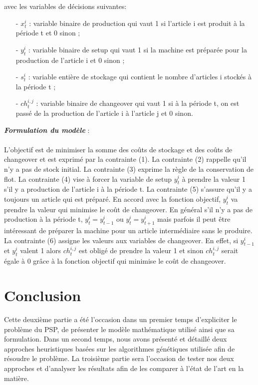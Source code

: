 \documentclass[12pt,a4paper]{article}
\begin{document}
		avec les variables de décisions suivantes: \\
		\begin{itemize}
			\item[-] $x_{t}^{i}$ : variable binaire de production qui vaut 1 si l’article i est produit à la période t et 0 sinon ;
			\item[-] $y_{t}^{i}$ : variable binaire de setup qui vaut 1 si la machine est préparée pour la production de l’article i et 0 sinon ;
			\item[-] $s_{t}^{i}$ : variable entière de stockage qui contient le nombre d’articles i stockés à la période t ; 
			\item[-] $ch_{t}^{i,j}$ : variable binaire de changeover qui vaut 1 si à la période t, on est passé de la production de l’article i à l’article j et 0 sinon.
		\end{itemize}
		\vspace*{.3cm}
		\textbf{\textsl{Formulation du modèle}} :\\
		\\
	\hspace*{.5cm} L'objectif est de minimiser la somme des coûts de stockage et des coûts de changeover et est exprimé par la contrainte (1). La contrainte (2) rappelle qu'il n'y a pas de stock initial. La contrainte (3) exprime la règle de la conservation de flot. La contrainte (4) vise à forcer la variable de setup $y_{t}^{i}$ à prendre la valeur 1 s’il y a production de l’article i à la période t. La contrainte (5) s'assure qu'il y a toujours un article qui est préparé. En accord avec la fonction objectif, $y_{t}^{i}$ va prendre la valeur qui minimise le coût de changeover. En général s’il n’y a pas de production à la période t,
$y_{t}^{i} = y_{t-1}^{i}$ ou $y_{t}^{i} = y_{t+1}^{i}$
mais parfois il peut être intéressant de préparer
la machine pour un article intermédiaire sans le produire. La contrainte (6) assigne les valeurs aux variables de changeover.
En effet, si $y_{t-1}^{i}$ et $y_{t}^{i}$ valent 1 alors $ch_{t}^{i,j}$ est obligé de prendre la valeur 1 et sinon $ch_{t}^{i,j}$ serait égale à 0 grâce à la fonction objectif qui minimise le coût de changeover.
		
		\section*{Conclusion}
		Cette deuxième partie a été l'occasion dans un premier temps d'expliciter le problème du PSP, de présenter le modèle mathématique utilisé ainsi que sa formulation. Dans un second temps, nous avons présenté et détaillé deux approches heuristiques basées sur les algorithmes génétiques utilisée afin de résoudre le problème. La troisième partie sera l'occasion de tester nos deux approches et d'analyser les résultats afin de les comparer à l'état de l'art en la matière.
		
\end{document}
